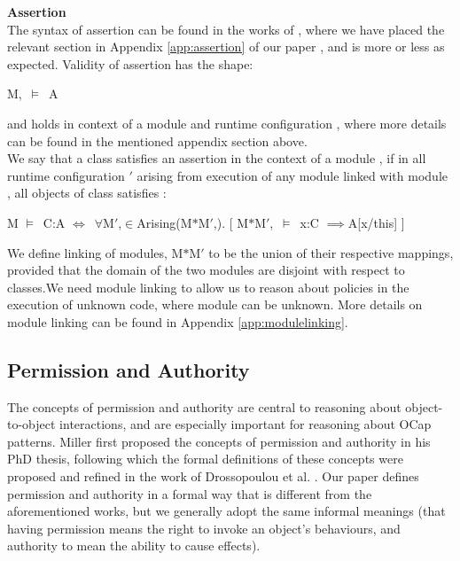 \documentclass[a4paper,11pt,twoside]{article}
\newenvironment{logic}
{\begin{minipage}[c]{\linewidth}  \sffamily \mdseries \begin{tabbing}}
{\end{tabbing}\end{minipage}\vspace{0.3em}}
\newcommand{\loin}{$\in$}
\newcommand{\loforall}{$\forall$}
\newcommand{\loimplies}{$\implies$}
\newcommand{\losigma}{\text{$\upsigma$}}
\newcommand{\loturns} {$\vDash$}
\newcommand{\loiff} {$\iff$}
\begin{document}
\textbf{Assertion}\\
The syntax of assertion can be found in the works of \cite{drossopoulou2015b}, where we have placed the relevant section in Appendix \cref{app:assertion} of our paper , and is more or less as expected. Validity of assertion has the shape:\\

\begin{logic}
M,\losigma\ \loturns\ A\\
\end{logic}

and holds in context of a module  and runtime configuration \sf{\losigma}, where more details can be found in the mentioned appendix section above.\\

We say that a class  satisfies an assertion  in the context of a module , if in all runtime configuration \losigma$'$ arising from execution of any module  linked with module , all objects of class  satisfies :\\

\begin{logic}
M \loturns\ C:A \loiff\ \loforall M$'$,\losigma\loin Arising(M$*$M$'$,\losigma). [ M$*$M$'$,\losigma\ \loturns\ x:C \loimplies A[x/this] ]\\
\end{logic}

We define linking of modules, M$*$M$'$ to be the union of their respective mappings, provided that the domain of the two modules are disjoint with respect to classes.We need module linking to allow us to reason about policies in the execution of unknown code, where module  can be unknown.  More details on module linking can be found in Appendix \cref{app:modulelinking}.
\subsection{Permission and Authority}\label{sec:permauth}
The concepts of permission and authority are central to reasoning about object-to-object interactions, and are especially important for reasoning about OCap patterns. Miller first proposed the concepts of permission and authority in his PhD thesis\cite{miller2006}, following which the formal definitions of these concepts were proposed and refined in the work of Drossopoulou et al. \cite{drossopoulou2016}. Our paper defines permission and authority in a formal way that is different from the aforementioned works, but we generally adopt the same informal meanings (that having permission means the right to invoke an object's behaviours, and authority to mean the ability to cause effects).
\end{document}
